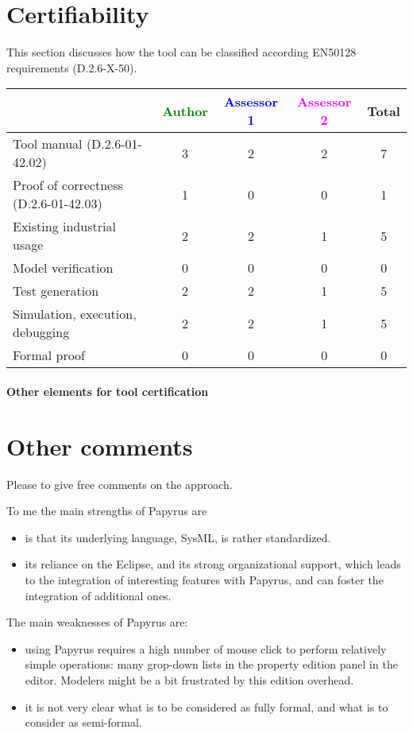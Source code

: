 \section{Certifiability}

This section discusses how the tool can be classified according EN50128 requirements (D.2.6-X-50).


\begin{tabular}{|l | c | c | c | c|}
\hline
& \textcolor{green}{Author} & \textcolor{blue}{Assessor 1} & \textcolor{magenta}{Assessor 2} & Total \\
\hline
Tool manual (D.2.6-01-42.02) & 3 & 2 & 2 & 7 \\
\hline
Proof of correctness (D.2.6-01-42.03) & 1 & 0 & 0  & 1 \\
\hline
Existing industrial usage & 2 & 2 & 1 & 5 \\
\hline
Model verification & 0 & 0 & 0 & 0 \\
\hline
Test generation & 2 & 2 & 1 & 5 \\
\hline
Simulation, execution, debugging & 2 & 2 & 1 & 5 \\
\hline
Formal proof & 0 & 0 & 0 & 0 \\
\hline
\end{tabular}

\paragraph{Other elements for tool certification}

\section{Other comments}
Please to give free comments on the approach.

\begin{assessor1}
To me the main strengths of Papyrus are
\begin{itemize}
\item is that its underlying language, SysML, is rather standardized. 
\item its reliance on the Eclipse, and its strong organizational support, which leads to the integration of interesting features with Papyrus, and can foster the integration of additional ones. 
\end{itemize}

The main weaknesses of Papyrus are: 
\begin{itemize}
\item using Papyrus requires a high number of mouse click to perform relatively simple operations: many grop-down lists in the property edition panel in the editor. Modelers might be a bit frustrated by this edition overhead. 
\item it is not very clear what is to be considered as fully formal, and what is to consider as semi-formal.  
\end{itemize}
\end{assessor1}

